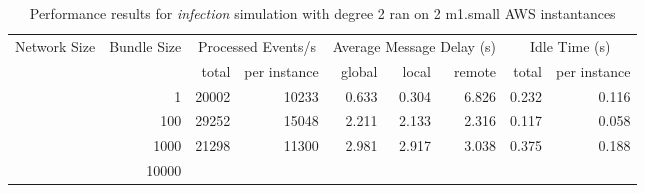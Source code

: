 	    

\begin{table}
	  \caption[Performance results, \emph{infection:2 on 2 m1.small instances }]{ Performance results for \emph{ infection } simulation with degree 2 ran on 2 m1.small AWS instantances }
	\begin{tabular}{rrrrrrrrr}
	\hline\noalign{\smallskip}

	Network Size &
	Bundle Size &
	\multicolumn{2}{c}{Processed Events/s} & 
	\multicolumn{3}{c}{Average Message Delay (s)} & 
	\multicolumn{2}{c}{Idle Time (s)}  \\

	 & 
	 & 
	 total & per instance
     & global & local & remote
     & total & per instance\\

			
				\noalign{\smallskip}\hline
				\multirow{ 4 }{*}{ 40000 } &
				
					
					 
					\multirow{ 1 }{*}{ 1 } &
					
						
							    
							     20002  & 10233  
	                           & 0.633 & 0.304 & 6.826
	                           & 0.232 & 0.116  \\
	                
	            
					 &  
					 
					\multirow{ 1 }{*}{ 100 } &
					
						
							    
							     29252  & 15048  
	                           & 2.211 & 2.133 & 2.316
	                           & 0.117 & 0.058  \\
	                
	            
					 &  
					 
					\multirow{ 1 }{*}{ 1000 } &
					
						
							    
							     21298  & 11300  
	                           & 2.981 & 2.917 & 3.038
	                           & 0.375 & 0.188  \\
	                
	            
					 &  
					 
					\multirow{ 1 }{*}{ 10000 } &
					
						
							    

\end{tabular}
\end{table}
